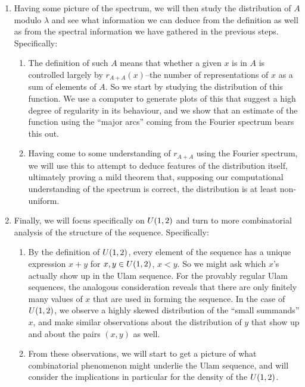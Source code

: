 \documentclass{report}
\theoremstyle{remark}
\numberwithin{equation}{section}
\begin{document}
\begin{enumerate}
\item Having some picture of the spectrum, we will then study the
  distribution of $A$ modulo $\lambda$ and see what information we can
  deduce from the definition as well as from the spectral information
  we have gathered in the previous steps.  Specifically:
  \begin{enumerate}
  \item The definition of such $A$ means that whether a given $x$ is
    in $A$ is controlled largely by $r_{A+A}(x)$--the number of
    representations of $x$ as a sum of elements of $A$.  So we start
    by studying the distribution of this function.  We use a computer
    to generate plots of this that suggest a high degree of regularity
    in its behaviour, and we show that an estimate of the function
    using the ``major arcs'' coming from the Fourier spectrum bears
    this out.
  \item Having come to some understanding of $r_{A+A}$ using the
    Fourier spectrum, we will use this to attempt to deduce features
    of the distribution itself, ultimately proving a mild theorem
    that, supposing our computational understanding of the spectrum is
    correct, the distribution is at least non-uniform.
  \end{enumerate}

\item Finally, we will focus specifically on $U(1,2)$ and turn to
  more combinatorial analysis of the structure of the sequence.
  Specifically: 
  \begin{enumerate}
  \item By the definition of $U(1,2)$, every element of the
    sequence has a unique expression $x+y$ for $x, y \in U(1,2)$,
    $x < y$.  So we might ask which $x$'s actually show up in the Ulam
    sequence.  For the provably regular Ulam sequences, the analogous
    consideration reveals that there are only finitely many values of
    $x$ that are used in forming the sequence.  In the case of
    $U(1,2)$, we observe a highly skewed distribution of the
    ``small summands'' $x$, and make similar observations about the
    distribution of $y$ that show up and about the pairs $(x, y)$ as
    well.
  \item From these observations, we will start to get a picture of
    what combinatorial phenomenon might underlie the Ulam sequence, and
    will consider the implications in particular for the density of
    the $U(1,2)$.
  \end{enumerate}
\end{enumerate}
\end{document}
